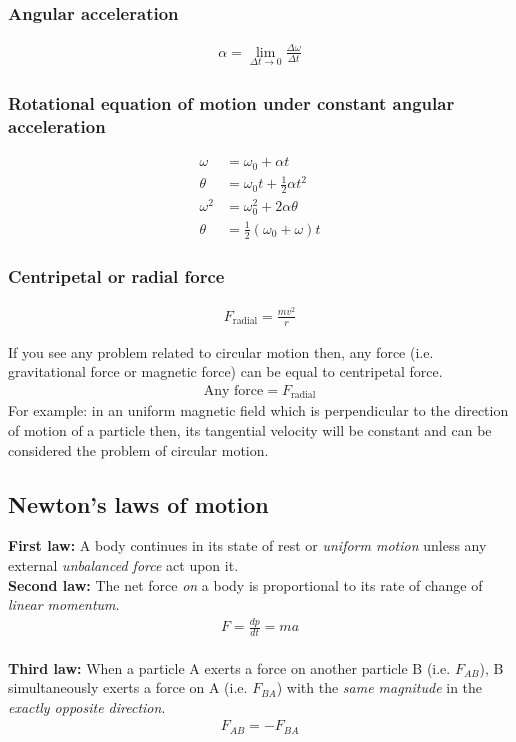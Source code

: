 \documentclass[12pt,a4paper]{article}
\begin{document}
\subsubsection*{Angular acceleration}
\begin{align*}
\alpha = \lim_{\Delta t \to 0}\frac{\Delta \omega}{\Delta t}
\end{align*}

\subsubsection*{Rotational equation of motion under constant angular acceleration}
\begin{align}
\omega &= \omega_{0} + \alpha t \\
\theta &= \omega_{0}t + \frac{1}{2}\alpha t^{2} \\
\omega^{2} &= \omega_{0}^{2} + 2\alpha \theta \\
\theta &= \frac{1}{2}(\omega_{0} + \omega)t
\end{align}

\subsubsection*{Centripetal or radial force}
\begin{align}
F_{\text{radial}} = \frac{mv^{2}}{r}
\end{align}

If you see any problem related to circular motion then, any force (i.e. gravitational force or magnetic force) can be equal to centripetal force. 
\begin{align*}
\text{Any force} = F_{\text{radial}}
\end{align*}
For example: in an uniform magnetic field which is perpendicular to the direction of motion of a particle then, its tangential velocity will be constant and can be considered the problem of circular motion.


\subsection{Newton's laws of motion}

\noindent\textbf{First law:} A body continues in its state of rest or \emph{uniform motion} unless any external \emph{unbalanced force} act upon it.
\\
\textbf{Second law:} The net force \emph{on} a body is proportional to its rate of change of \emph{linear momentum}.
\begin{align*}
F = \frac{dp}{dt} = ma
\end{align*}
\\
\textbf{Third law:} When a particle A exerts a force on another particle B (i.e. $F_{AB}$), B simultaneously exerts a force on A (i.e. $F_{BA}$) with the \emph{same magnitude} in the \emph{exactly opposite direction}.
\begin{align*}
F_{AB} = - F_{BA}
\end{align*}
\end{document}
